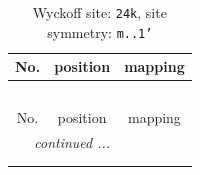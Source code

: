 \documentclass[fleqn,8pt]{jsarticle}
\begin{document}
\renewcommand{\arraystretch}{1.2}
\begin{longtable}{ccc}
\caption{Wyckoff site: {\tt 24k}, site symmetry: {\tt m..1'}}
 \\
 \hline \hline
No. & position & mapping \\ \hline \endfirsthead

\multicolumn{2}{l}{\tablename\ \thetable{}} \\
 \hline \hline
No. & position & mapping \\ \hline \endhead

 \hline \hline
\multicolumn{2}{r}{\footnotesize\it continued ...} \\ \endfoot

 \hline \hline
\multicolumn{2}{r}{} \\ \endlastfoot


\end{longtable}
\end{document}
